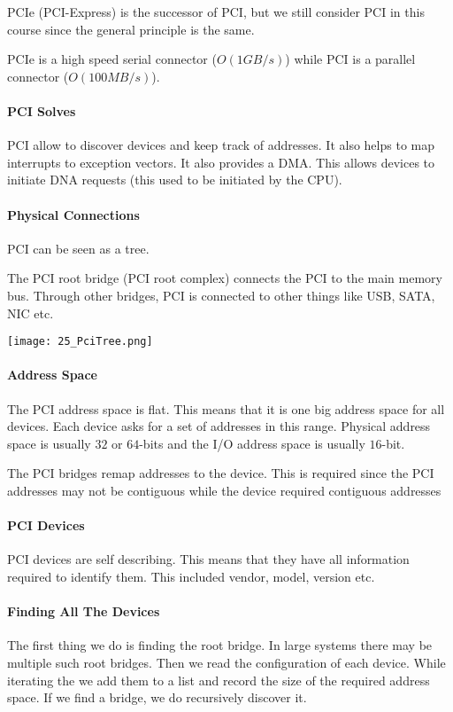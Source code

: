 PCIe (PCI-Express) is the successor of PCI, but we still consider PCI in this course since the general principle is the same.

PCIe is a high speed serial connector ($O(1GB/s)$) while PCI is a parallel connector ($O(100MB/s)$).

\paragraph{PCI Solves}
PCI allow to discover devices and keep track of addresses. It also helps to map interrupts to exception vectors. It also provides a DMA. This allows devices to initiate DNA requests (this used to be initiated by the CPU).

\paragraph{Physical Connections}
PCI can be seen as a tree. 

The PCI root bridge (PCI root complex) connects the PCI to the main memory bus. Through other bridges, PCI is connected to other things like USB, SATA, NIC etc.

\texttt{[image: 25\_PciTree.png]}

\paragraph{Address Space}
The PCI address space is flat. This means that it is one big address space for all devices. Each device asks for a set of addresses in this range. Physical address space is usually $32$ or $64$-bits and the I/O address space is usually $16$-bit.

The PCI bridges remap addresses to the device. This is required since the PCI addresses may not be contiguous while the device required contiguous addresses

\paragraph{PCI Devices}
PCI devices are self describing. This means that they have all information required to identify them. This included vendor, model, version etc.

\paragraph{Finding All The Devices}
The first thing we do is finding the root bridge. In large systems there may be multiple such root bridges. Then we read the configuration of each device. While iterating the we add them to a list and record the size of the required address space. If we find a bridge, we do recursively discover it.

